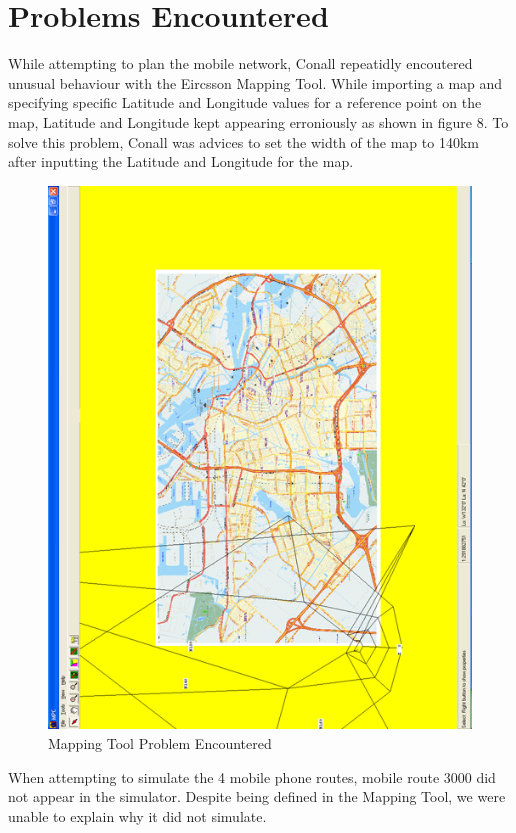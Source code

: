 \documentclass[a4paper,12pt]{article}
\begin{document}
\section{Problems Encountered}

While attempting to plan the mobile network, Conall repeatidly
encoutered unusual behaviour with the Eircsson Mapping Tool. While
importing a map and specifying specific Latitude and Longitude values
for a reference point on the map, Latitude and Longitude kept appearing
erroniously as shown in figure 8. To solve this problem, Conall
was advices to set the width of the map to 140km after inputting the 
Latitude and Longitude for the map. 

\begin{figure}[h]

\includegraphics{oddness.png}

\caption{Mapping Tool Problem Encountered}

\end{figure}

When attempting to simulate the 4 mobile phone routes, mobile route 3000
did not appear in the simulator. Despite being defined in the Mapping
Tool, we were unable to explain why it did not simulate.
\end{document}
